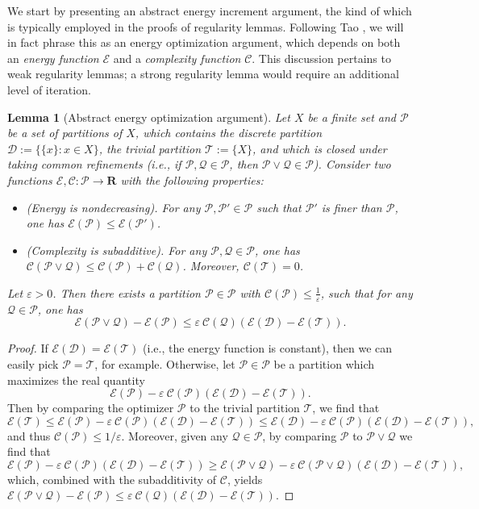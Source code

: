 \documentclass[reqno,11pt]{amsart}
\newtheorem{lemma}[theorem]{Lemma}
\theoremstyle{definition}
\theoremstyle{remark}
\numberwithin{equation}{section}
\newcommand{\R}{\mathbf{R}}
\newcommand{\mE}{\mathcal{E}}
\newcommand{\mD}{\mathcal{D}}
\newcommand{\mP}{\mathcal{P}}
\newcommand{\mQ}{\mathcal{Q}}
\newcommand{\mC}{\mathcal{C}}
\newcommand{\mT}{\mathcal{T}}
\newcommand{\eps}{\varepsilon}
\newcommand{\Energy}{\mE}
\newcommand{\Complexity}{\mC}
\begin{document}
We start by presenting an abstract energy increment argument, the kind of which is typically employed in the proofs of regularity lemmas. Following Tao \cite{tao2005szemer}, we will in fact phrase this as an energy optimization argument, which depends on both an \emph{energy function} $\Energy$ and a \emph{complexity function} $\Complexity$. This discussion pertains to weak regularity lemmas; a strong regularity lemma would require an additional level of iteration.

\begin{lemma}[Abstract energy optimization argument] \label{lem:energy-optimization}
Let $X$ be a finite set and $\mathscr{P}$ be a set of partitions of $X$, which contains the discrete partition $\mD := \{\{x\} : x \in X\}$, the trivial partition $\mT := \{X\}$, and which is closed under taking common refinements (i.e., if $\mP, \mQ \in \mathscr{P}$, then $\mP \vee \mQ \in \mathscr{P}$). Consider two functions $\Energy, \Complexity : \mathscr{P} \to \R$ with the following properties:
\begin{itemize}
    \item[$(i)$] \emph{(Energy is nondecreasing)}. For any $\mP, \mP' \in \mathscr{P}$ such that $\mP'$ is finer than $\mP$, one has $\Energy(\mP) \le \Energy(\mP')$.
    \item[$(ii)$] \emph{(Complexity is subadditive)}. For any $\mP, \mQ \in \mathscr{P}$, one has $\Complexity(\mP \vee \mQ) \le \Complexity(\mP) + \Complexity(\mQ)$. Moreover, $\Complexity(\mT) = 0$.
\end{itemize}
Let $\eps > 0$. Then there exists a partition $\mP \in \mathscr{P}$ with $\Complexity(\mP) \le \frac{1}{\eps}$, such that for any $\mQ \in \mathscr{P}$, one has
\[
    \Energy(\mP \vee \mQ) - \Energy(\mP) \le \eps\ \Complexity(\mQ) \left(\Energy(\mD) - \Energy(\mT)\right).
\]
\end{lemma}
\begin{proof}
If $\Energy(\mD) = \Energy(\mT)$ (i.e., the energy function is constant), then we can easily pick $\mP = \mT$, for example. Otherwise, let $\mP \in \mathscr{P}$ be a partition which maximizes the real quantity
\[
    \Energy(\mP) - \eps\ \Complexity(\mP) \left(\Energy(\mD) - \Energy(\mT)\right).
\]
Then by comparing the optimizer $\mP$ to the trivial partition $\mT$, we find that
\[
    \Energy(\mT) \le \Energy(\mP) - \eps\ \Complexity(\mP) \left(\Energy(\mD) - \Energy(\mT)\right)
    \le 
    \Energy(\mD) - \eps\ \Complexity(\mP) \left(\Energy(\mD) - \Energy(\mT)\right),
\]
and thus $\Complexity(\mP) \le 1/\eps$. Moreover, given any $\mQ \in \mathscr{P}$, by comparing $\mP$ to $\mP \vee \mQ$ we find that
\[
    \Energy(\mP) - \eps\ \Complexity(\mP) \left(\Energy(\mD) - \Energy(\mT)\right)
    \ge 
    \Energy(\mP \vee \mQ) - \eps\ \Complexity(\mP \vee \mQ) \left(\Energy(\mD) - \Energy(\mT)\right),
\]
which, combined with the subadditivity of $\Complexity$, yields $\Energy(\mP \vee \mQ) - \Energy(\mP) \le \eps\ \Complexity(\mQ) \left(\Energy(\mD) - \Energy(\mT)\right)$. 
\end{proof}
\end{document}
